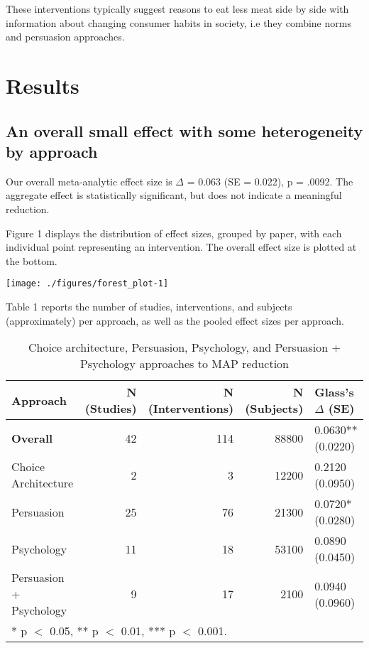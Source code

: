 \documentclass[sn-nature,pdflatex]{sn-jnl}
\begin{document}
These interventions typically suggest reasons to eat less meat side by
side with information about changing consumer habits in society, i.e
they combine norms and persuasion approaches.

\section{Results}\label{sec2}

\subsection{An overall small effect with some heterogeneity by
approach}\label{sec2.1}

Our overall meta-analytic effect size is \(\Delta\) = 0.063 (SE =
0.022), p = .0092. The aggregate effect is statistically significant,
but does not indicate a meaningful reduction.

Figure 1 displays the distribution of effect sizes, grouped by paper,
with each individual point representing an intervention. The overall
effect size is plotted at the bottom.

\texttt{[image: ./figures/forest\_plot-1]}

Table 1 reports the number of studies, interventions, and subjects
(approximately) per approach, as well as the pooled effect sizes per
approach.

\begin{table}[!h]
\centering
\caption{\label{tab:table_one}Choice architecture, Persuasion, Psychology, and Persuasion + Psychology approaches to MAP reduction}
\centering
\begin{tabular}[t]{lrrrl}
\toprule
Approach & N (Studies) & N (Interventions) & N (Subjects) & Glass's $\Delta$ (SE)\\
\midrule
\textbf{Overall} & 42 & 114 & 88800 & 0.0630** (0.0220)\\
Choice Architecture & 2 & 3 & 12200 & 0.2120 (0.0950)\\
Persuasion & 25 & 76 & 21300 & 0.0720* (0.0280)\\
Psychology & 11 & 18 & 53100 & 0.0890 (0.0450)\\
Persuasion + Psychology & 9 & 17 & 2100 & 0.0940 (0.0960)\\
\bottomrule
\multicolumn{5}{l}{\rule{0pt}{1em}* p $<$ 0.05, ** p $<$ 0.01, *** p $<$ 0.001.}\\
\end{tabular}
\end{table}
\end{document}
